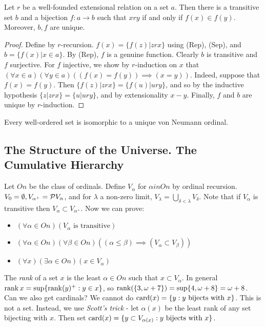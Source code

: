 \documentclass[10pt,a4paper]{article}
\begin{document}
\begin{theorem}
Let $r$ be a well-founded extensional relation on a set $a$. Then there is a transitive set $b$ and a bijection $f:a \to b$ such that $x ry$ if and only if $f(x) \in f(y)$. Moreover, $b,f$ are unique.
\end{theorem}
\begin{proof}
Define by $r$-recursion. $f(x) = \{f(z)|zrx\}$ using (Rep), (Sep), and $b = \{f(x)|x \in a\}$. By (Rep), $f$ is a genuine function. Clearly $b$ is transitive and $f$ surjective. For $f$ injective, we show by $r$-induction on $x$ that $(\forall x \in a)(\forall y \in a)((f(x)=f(y)) \implies (x=y))$. Indeed, suppose that $f(x)=f(y)$. Then $\{f(z)|zrx\} = \{f(u)|ury\}$, and so by the inductive hypothesis $\{z|zrx\}=\{u|ury\}$, and by extensionality $x-y$. Finally, $f$ and $b$ are unique by $r$-induction.
\end{proof}
\begin{corollary}
Every well-ordered set is isomorphic to a unique von Neumann ordinal.
\end{corollary}
\subsection{The Structure of the Universe. The Cumulative Hierarchy}
Let $On$ be the class of ordinals. Define $V_\alpha$ for $\alpha in On$ by ordinal recursion. $V_0 = \emptyset, V_{\alpha^+} = \mathcal{P} V_\alpha$, and for $\lambda$ a non-zero limit, $V_\lambda = \bigcup_{\delta<\lambda} V_\delta$. Note that if $V_\alpha$ is transitive then $V_\alpha \subset V_{\alpha^+}$. Now we can prove:
\begin{itemize}
\item $(\forall \alpha \in On)(V_\alpha\text{ is transitive})$
\item $(\forall \alpha \in On)(\forall \beta \in On)((\alpha \leq \beta) \implies (V_\alpha \subset V_\beta))$
\item $(\forall x)(\exists \alpha \in On)(x \in V_\alpha)$
\end{itemize}
The \emph{rank} of a set $x$ is the least $\alpha \in On$ such that $x \subset V_\alpha$. In general $\operatorname{rank} x = \sup\{\operatorname{rank}(y)^+ : y \in x\}$, so $\operatorname{rank}(\{3,\omega+7\})= \sup\{4, \omega+8\} = \omega+8$. Can we also get cardinals? We cannot do $\operatorname{card}(x) = \{y : y \text{ bijects with } x\}$. This is not a set. Instead, we use \emph{Scott's trick} - let $\alpha(x)$ be the least rank of any set bijecting with $x$. Then set $\operatorname{card}(x) = \{y \subset V_{\alpha(x)} : y \text{ bijects with } x\}$.
\end{document}
